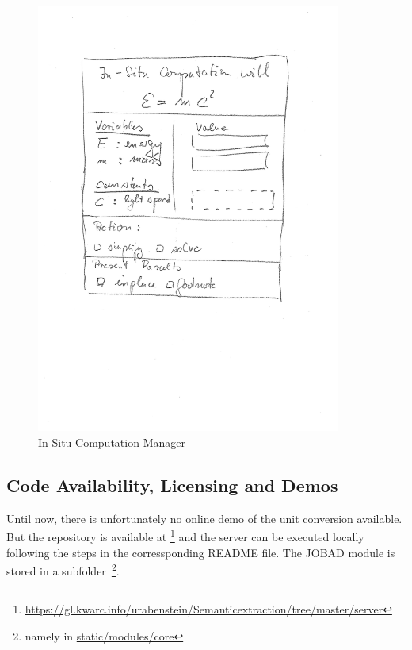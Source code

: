   \begin{figure}[ht]\centering
    \includegraphics[width=10cm]{compman}
    \caption{In-Situ Computation Manager}\label{fig:compman}
  \end{figure}

\subsection{Code Availability, Licensing and Demos}  

  Until now, there is unfortunately no online demo of the unit conversion available. 
  But the repository is available at
  \footnote{\url{https://gl.kwarc.info/urabenstein/Semanticextraction/tree/master/server}}
  and the server can be executed locally following the steps in the corressponding README file. 
  The JOBAD module is stored in a subfolder~\footnote{namely in \url{static/modules/core}}. 

  
